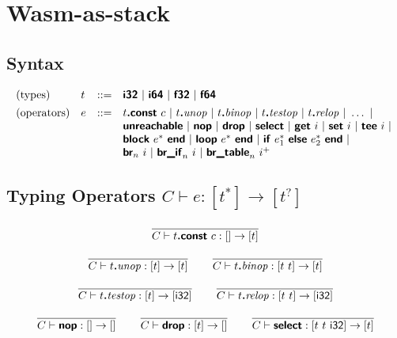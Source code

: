 \documentclass[a4paper]{scrartcl}
\newcommand\x[1]{\ensuremath{\mathit{#1}}\xspace}
\newcommand\K[1]{\ensuremath{\textsf{#1}}}
\newcommand\KK[1]{\ensuremath{\K{\textbf{#1}}}}
\begin{document}

\section{Wasm-as-stack}


\subsection*{Syntax}

$$
\begin{array}{@{}llcl@{}}
\text{(types)} & t &::=&
  \KK{i32} ~|~
  \KK{i64} ~|~
  \KK{f32} ~|~
  \KK{f64} \\
[1ex]
\text{(operators)} & e &::=&
  t\KK{.const}~c ~|~
  t\KK{.}\x{unop} ~|~
  t\KK{.}\x{binop} ~|~
  t\KK{.}\x{testop} ~|~
  t\KK{.}\x{relop} ~|~
  \dots ~|~ \\&&&
  \KK{unreachable} ~|~
  \KK{nop} ~|~
  \KK{drop} ~|~
  \KK{select} ~|~
  \KK{get}~i ~|~
  \KK{set}~i ~|~
  \KK{tee}~i ~|~ \\&&&
  \KK{block}~e^\ast~\KK{end} ~|~
  \KK{loop}~e^\ast~\KK{end} ~|~
  \KK{if}~e_1^\ast~\KK{else}~e_2^\ast~\KK{end} ~|~ \\&&&
  \KK{br}_n~i ~|~
  \KK{br\_if}_n~i ~|~
  \KK{br\_table}_n~i^+ \\
\end{array}
$$


\newcommand\orbot{}
\newcommand\poly[1]{[#1]}
\newcommand\botrule[1]{}


\subsection*{Typing Operators \hfill $\boxed{C \vdash e : [t^\ast] \to [t^?]\orbot}$}

$$
\frac{
}{
  C \vdash t\KK{.const}~c : [] \to [t]
}
$$

$$
\frac{
}{
  C \vdash t\KK{.}\x{unop} : [t] \to [t]
}
\qquad
\frac{
}{
  C \vdash t\KK{.}\x{binop} : [t~t] \to [t]
}
$$

$$
\frac{
}{
  C \vdash t\KK{.}\x{testop} : [t] \to [\K{i32}]
}
\qquad
\frac{
}{
  C \vdash t\KK{.}\x{relop} : [t~t] \to [\K{i32}]
}
$$

$$
\frac{
}{
  C \vdash \KK{nop} : [] \to []
}
\qquad
\frac{
}{
  C \vdash \KK{drop} : [t] \to []
}
\qquad
\frac{
}{
  C \vdash \KK{select} : [t~t~\K{i32}] \to [t]
}
$$
\end{document}
